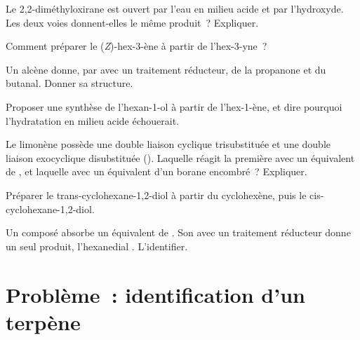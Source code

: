 \begin{exercise}[$\star\star$]\label{exo:b2:alkene-redox:6}
Le 2,2-diméthyloxirane est ouvert par l'eau en milieu acide et par l'hydroxyde. Les deux voies
donnent-elles le même produit~? Expliquer.
\end{exercise}

\begin{exercise}[$\star\star$]\label{exo:b2:alkene-redox:7}
Comment préparer le (\textit{Z})-hex-3-ène à partir de l'hex-3-yne~?
\end{exercise}

\begin{exercise}[$\star\star$]\label{exo:b2:alkene-redox:8}
Un alcène  donne, par  avec un traitement réducteur, de la propanone et du
butanal. Donner sa structure.
\end{exercise}

\begin{exercise}[$\star\star$]\label{exo:b2:alkene-redox:9}
Proposer une synthèse de l'hexan-1-ol à partir de l'hex-1-ène, et dire pourquoi l'hydratation
en milieu acide échouerait.
\end{exercise}

\begin{exercise}[$\star\star\star$]\label{exo:b2:alkene-redox:10}
Le limonène possède une double liaison cyclique trisubstituée et une double liaison exocyclique
disubstituée (). Laquelle réagit la première avec un équivalent de ,
et laquelle avec un équivalent d'un borane encombré~? Expliquer.
\end{exercise}

\begin{exercise}[$\star\star\star$]\label{exo:b2:alkene-redox:11}
Préparer le trans-cyclohexane-1,2-diol à partir du cyclohexène, puis le cis-cyclohexane-1,2-diol.
\end{exercise}

\begin{exercise}[$\star\star\star$]\label{exo:b2:alkene-redox:12}
Un composé  absorbe un équivalent de . Son  avec un traitement
réducteur donne un seul produit, l'hexanedial . L'identifier.
\end{exercise}

\clearpage
\enlargethispage{3\baselineskip}
\section{Problème~: identification d'un terpène}

